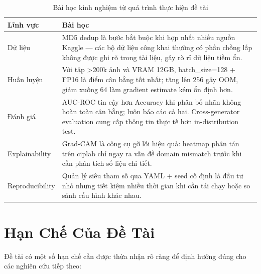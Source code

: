 \begin{table}[H]
  \centering
  \caption{Bài học kinh nghiệm từ quá trình thực hiện đề tài}
  \label{tab:lessons}
  \begin{tabularx}{\linewidth}{lX}
    \toprule
    \textbf{Lĩnh vực} & \textbf{Bài học} \\
    \midrule
    Dữ liệu & MD5 dedup là bước bắt buộc khi hợp nhất nhiều nguồn Kaggle --- các bộ dữ liệu công khai thường có phần chồng lấp không được ghi rõ trong tài liệu, gây rò rỉ dữ liệu tiềm ẩn. \\
    Huấn luyện & Với tập >200k ảnh và VRAM 12GB, batch\_size=128 + FP16 là điểm cân bằng tốt nhất; tăng lên 256 gây OOM, giảm xuống 64 làm gradient estimate kém ổn định hơn. \\
    Đánh giá & AUC-ROC tin cậy hơn Accuracy khi phân bố nhãn không hoàn toàn cân bằng; luôn báo cáo cả hai. Cross-generator evaluation cung cấp thông tin thực tế hơn in-distribution test. \\
    Explainability & Grad-CAM là công cụ gỡ lỗi hiệu quả: heatmap phân tán trên ciplab chỉ ngay ra vấn đề domain mismatch trước khi cần phân tích số liệu chi tiết. \\
    Reproducibility & Quản lý siêu tham số qua YAML + seed cố định là đầu tư nhỏ nhưng tiết kiệm nhiều thời gian khi cần tái chạy hoặc so sánh cấu hình khác nhau. \\
    \bottomrule
  \end{tabularx}
\end{table}

\section{Hạn Chế Của Đề Tài}

Đề tài có một số hạn chế cần được thừa nhận rõ ràng để định hướng đúng cho các nghiên cứu tiếp theo:

